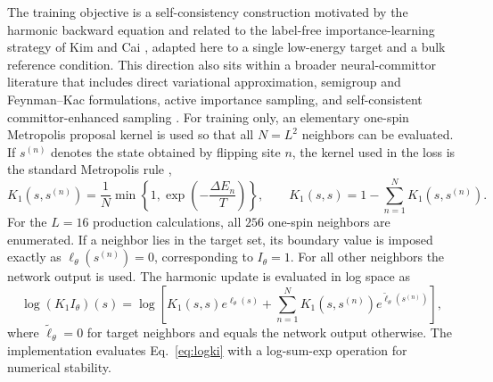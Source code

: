 \documentclass[a4paper,fleqn]{cas-sc}
\begin{document}
The training objective is a self-consistency construction motivated by the harmonic backward
equation and related to the label-free importance-learning strategy of Kim and Cai
\citep{kimcai2026}, adapted here to a single low-energy target and a bulk reference condition.
This direction also sits within a broader neural-committor literature that includes direct
variational approximation, semigroup and Feynman--Kac formulations, active importance
sampling, and self-consistent committor-enhanced sampling
\citep{khoo2019,li2022,rotskoff2022,strahan2023,kang2024,trizio2025}.
For training only, an elementary one-spin Metropolis proposal kernel is used so that all
$N=L^2$ neighbors can be evaluated.  If $s^{(n)}$ denotes the state obtained by flipping site
$n$, the kernel used in the loss is the standard Metropolis rule \citep{metropolis1953},
\begin{equation}
K_1\!\left(s,s^{(n)}\right)=\frac{1}{N}\min\!\left\{1,
\exp\!\left(-\frac{\Delta E_n}{T}\right)\right\},\qquad
K_1(s,s)=1-\sum_{n=1}^{N}K_1\!\left(s,s^{(n)}\right).
\label{eq:singleflip}
\end{equation}
For the $L=16$ production calculations, all $256$ one-spin neighbors are enumerated.  If a
neighbor lies in the target set, its boundary value is imposed exactly as
$\ell_\theta(s^{(n)})=0$, corresponding to $I_\theta=1$.  For all other neighbors the network
output is used.  The harmonic update is evaluated in log space as
\begin{equation}
\log (K_1 I_\theta)(s)=
\log\!\left[
K_1(s,s)e^{\ell_\theta(s)}+
\sum_{n=1}^{N}K_1\!\left(s,s^{(n)}\right)
 e^{\widetilde\ell_\theta(s^{(n)})}
\right],
\label{eq:logki}
\end{equation}
where $\widetilde\ell_\theta=0$ for target neighbors and equals the network output otherwise.
The implementation evaluates Eq.~\eqref{eq:logki} with a log-sum-exp operation for numerical
stability.
\end{document}
